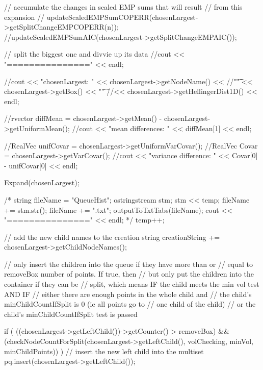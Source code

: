 \begin{DoxyCode}
{{{            // accumulate the changes in scaled EMP sums that will result
            // from this expansion
            //
      updateScaledEMPSumCOPERR(chosenLargest->getSplitChangeEMPCOPERR(n));
            //updateScaledEMPSumAIC(chosenLargest->getSplitChangeEMPAIC());

            // split the biggest one and divvie up its data
        //cout << "===============" << endl;
        
        //cout << "chosenLargest: " << chosenLargest->getNodeName() << 
        //"\t" << chosenLargest->getBox() << "\t"
        //<< chosenLargest->getHellingerDist1D() << endl;
          
        //rvector diffMean = chosenLargest->getMean() -
       chosenLargest->getUniformMean();
        //cout << "mean differences: " << diffMean[1] << endl;

        //RealVec unifCovar = chosenLargest->getUniformVarCovar();
        //RealVec Covar = chosenLargest->getVarCovar();
        //cout << "variance difference: " << Covar[0] - unifCovar[0] << endl;
        
        Expand(chosenLargest);

        /*
        string fileName = "QueueHist";
        ostringstream stm;
        stm << temp;
        fileName += stm.str();
        fileName += ".txt";
        outputToTxtTabs(fileName);
        cout << "===============" << endl;
        */
        temp++;
         
            // add the new child names to the creation string
            creationString += chosenLargest->getChildNodeNames();
            
            // only insert the children into the queue if they have more than
       or
            // equal to removeBox number of points. If true, then
               // but only put the children into the container if they can be
            // split, which means IF the child meets the min vol test AND IF
            // either there are enough points in the whole child and
                // the child's minChildCountIfSplit is 0 (ie all points go to
                // one child of the child)
            // or the child's minChildCountIfSplit test is passed
            
            if ( ((chosenLargest->getLeftChild())->getCounter() > removeBox) 
            && (checkNodeCountForSplit(chosenLargest->getLeftChild(),
                    volChecking, minVol, minChildPoints)) ) {
                // insert the new left child into the multiset
                pq.insert(chosenLargest->getLeftChild());
            }

}}}
\end{DoxyCode}
